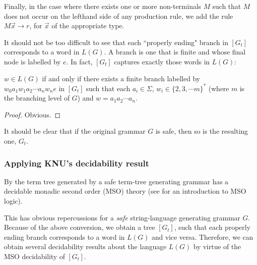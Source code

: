 Finally, in the case where there exists one or more non-terminals
$M$ such that $M$ does not occur on the lefthand side of any
production rule, we add the rule $M\overrightarrow{x} \rightarrow
r$, for $\overrightarrow{x}$ of the appropriate type.

It should not be too difficult to see that each ``properly ending"
branch in $[G_t]$ corresponds to a word in $L(G)$. A
 branch is one that is finite and whose
final node is labelled by $e$. In fact, $[G_t]$ captures exactly
those words in $L(G)$:

\begin{lemma}
$w \in L(G)$ if and only if there exists a finite branch labelled
by $w_0a_1w_1a_2 \cdots a_nw_ne$ in $[G_t]$ such that each $a_i
\in \Sigma$, $w_i \in \{2,3, \cdots m\}^*$ (where $m$ is the
branching level of $G$) and $w = a_1a_2 \cdots a_n$.
\end{lemma}

\begin{proof} Obvious.
\end{proof}


\begin{remark} It should be clear that if the
original grammar $G$ is safe, then so is the resulting one, $G_t$.
\end{remark}

\subsubsection*{Applying KNU's decidability result}

By \cite{KNU02} the term tree generated by a safe term-tree
generating grammar has a decidable monadic second order (MSO)
theory (see \cite{Tho97} for an introduction to MSO logic).

This has obvious repercussions for a \emph{safe} string-language
generating grammar $G$. Because of the above conversion, we obtain
a tree $[G_t]$, such that each properly ending branch corresponds
to a word in $L(G)$ and vice versa. Therefore, we can obtain
several decidability results about the language $L(G)$ by virtue
of the MSO decidability of $[G_t]$.

